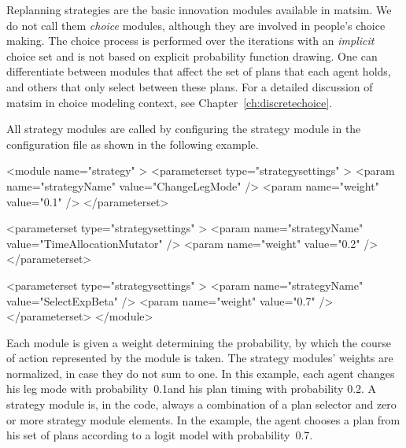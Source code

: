 Replanning strategies are the basic innovation modules available in \gls{matsim}. We do not call them \emph{choice} modules, although they are involved in people's choice making. The choice process is performed over the iterations with an \emph{implicit} choice set and is not based on explicit probability function drawing.  One can differentiate between modules that affect the set of plans that each agent holds, and others that only select between these plans.
%
For a detailed discussion of \gls{matsim} in choice modeling 
context, see Chapter~\ref{ch:discretechoice}.

All strategy modules are called by configuring the strategy module in the configuration file as shown in the following example.
%
\begin{xml}
<module name="strategy" >
	<parameterset type="strategysettings" >
		<param name="strategyName" value="ChangeLegMode" />
		<param name="weight" value="0.1" />
	</parameterset>
	
	<parameterset type="strategysettings" >
		<param name="strategyName" value="TimeAllocationMutator" />
		<param name="weight" value="0.2" />
	</parameterset>
	
	<parameterset type="strategysettings" >
		<param name="strategyName" value="SelectExpBeta" />
		<param name="weight" value="0.7" />
	</parameterset>
</module>
\end{xml}
%
Each module is given a weight determining the probability, by which the course of action represented by the module is taken. The strategy modules' weights are normalized, in case they do not sum to one. In this example, each agent changes his leg mode with probability~0.1and his plan timing with probability 0.2. A strategy module is, in the code, always a combination of a plan selector and zero or more strategy module elements. In the example, the agent chooses a plan from his set of plans according to a logit model with probability~0.7. 


